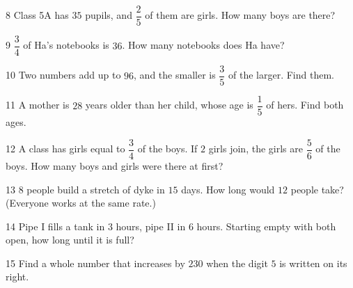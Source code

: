 \gap
\begin{probbox}{8}{\relax}
Class 5A has $35$ pupils, and $\dfrac25$ of them are girls. How many boys are there?
\end{probbox}
\gap
\begin{probbox}{9}{\relax}
$\dfrac34$ of Ha's notebooks is $36$. How many notebooks does Ha have?
\end{probbox}
\gap
\begin{probbox}{10}{\relax}
Two numbers add up to $96$, and the smaller is $\dfrac35$ of the larger. Find them.
\end{probbox}
\gap
\begin{probbox}{11}{\relax}
A mother is $28$ years older than her child, whose age is $\dfrac15$ of hers. Find both ages.
\end{probbox}
\gap
\begin{probbox}{12}{\relax}
A class has girls equal to $\dfrac34$ of the boys. If $2$ girls join, the girls are $\dfrac56$ of the boys. How many boys and girls were there at first?
\end{probbox}
\gap
\begin{probbox}{13}{\relax}
$8$ people build a stretch of dyke in $15$ days. How long would $12$ people take? (Everyone works at the same rate.)
\end{probbox}
\gap
\begin{probbox}{14}{\relax}
Pipe I fills a tank in $3$ hours, pipe II in $6$ hours. Starting empty with both open, how long until it is full?
\end{probbox}
\gap
\begin{probbox}{15}{}
Find a whole number that increases by $230$ when the digit $5$ is written on its right.
\end{probbox}
